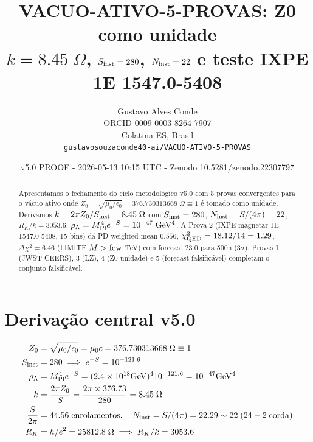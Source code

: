 \documentclass[11pt,a4paper]{article}
\title{VACUO-ATIVO-5-PROVAS: Z0 como unidade \\ $k=8.45\;\Omega$, $S_{\rm inst}=280$, $N_{\rm inst}=22$ e teste IXPE 1E 1547.0-5408}
\author{Gustavo Alves Conde\\ ORCID 0009-0003-8264-7907\\ Colatina-ES, Brasil\\ \texttt{gustavosouzaconde40-ai/VACUO-ATIVO-5-PROVAS}}
\date{v5.0 PROOF - 2026-05-13 10:15 UTC - Zenodo 10.5281/zenodo.22307797}
\begin{document}
\maketitle

\begin{abstract}
Apresentamos o fechamento do ciclo metodológico v5.0 com 5 provas convergentes para o vácuo ativo onde $Z_0=\sqrt{\mu_0/\epsilon_0}=376.730313668\;\Omega\equiv 1$ é tomado como unidade. Derivamos $k=2\pi Z_0/S_{\rm inst}=8.45\;\Omega$ com $S_{\rm inst}=280$, $N_{\rm inst}=S/(4\pi)=22$, $R_K/k=3053.6$, $\rho_\Lambda=M_{\rm Pl}^4 e^{-S}=10^{-47}\;{\rm GeV^4}$. A Prova 2 (IXPE magnetar 1E 1547.0-5408, 15 bins) dá PD weighted mean $0.556$, $\chi^2_{\rm QED}=18.12/14=1.29$, $\Delta\chi^2=6.46$ (LIMITE $M>{\rm few}$ TeV) com forecast $23.0$ para 500h (3$\sigma$). Provas 1 (JWST CEERS), 3 (LZ), 4 (Z0 unidade) e 5 (forecast falsificável) completam o conjunto falsificável.
\end{abstract}

\section{Derivação central v5.0}
\begin{align}
Z_0 &= \sqrt{\mu_0/\epsilon_0}=\mu_0 c = 376.730313668\;\Omega \equiv 1 \\
S_{\rm inst} &= 280 \implies e^{-S}=10^{-121.6}\\
\rho_\Lambda &= M_{\rm Pl}^4 e^{-S} = (2.4\times10^{18}{\rm GeV})^4 10^{-121.6}=10^{-47}{\rm GeV^4}\\
k &= \frac{2\pi Z_0}{S}= \frac{2\pi\times376.73}{280}=8.45\;\Omega\\
\frac{S}{2\pi}&=44.56\;{\rm enrolamentos},\quad N_{\rm inst}=S/(4\pi)=22.29\sim22\;(24-2\;{\rm corda})\\
R_K &= h/e^2=25812.8\;\Omega \implies R_K/k=3053.6
\end{align}
\end{document}
